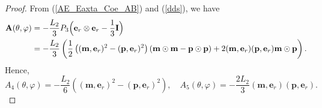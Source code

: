 \documentclass[10pt, a4paper]{article}
\newcommand\n{\mathbf{n}}
\newcommand\e{\mathbf{e}}
\newcommand\m{\mathbf{m}}
\newcommand\p{\mathbf{p}}
\newcommand\pp{\partial}
\begin{document}
\begin{proof}
From (\ref{AE_Eaxta_Coe_AB}) and (\ref{dds}), we have
\begin{equation}
\begin{aligned}
 \mathbf{A} (\theta, \varphi) &  = - \frac{L_2}{3} P_3 \Bigl( \e_r \otimes \e_r - \frac{1}{3} \mathbf{I} \Bigr) \\
                              & = - \frac{L_2}{3} \left( \frac{1}{2} \left( (\m, \e_r)^2 - (\p, \e_r)^2 \right)     \left( \m \odot \m - \p \odot \p \right)  + 2 (\m, \e_r) (\p, \e_r)\m \odot \p \right). \\
\end{aligned}
\end{equation}
Hence,
\begin{equation}\label{Extra_A45}
A_4(\theta, \varphi) = -\dfrac{L_2}{6} \left( (\m, \e_r)^2 - (\p, \e_r)^2 \right), \quad A_5(\theta, \varphi) = - \dfrac{2L_2}{3} (\m, \e_r)(\p, \e_r).
\end{equation}



\end{proof}
\end{document}
